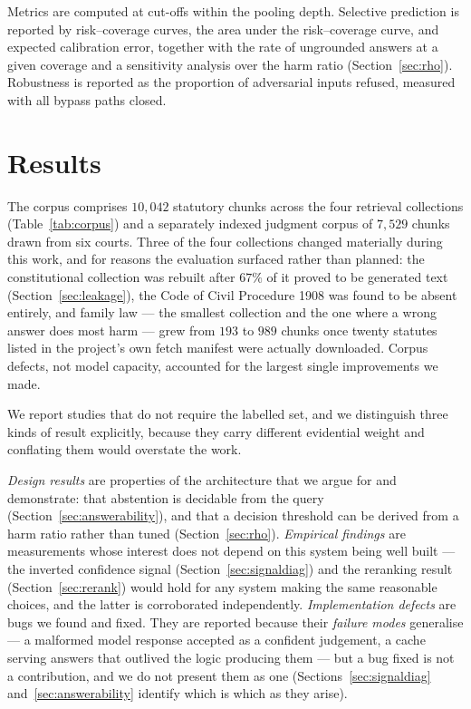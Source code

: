 \documentclass[conference]{IEEEtran}
\begin{document}
Metrics are computed at cut-offs within the pooling depth. Selective prediction is reported by
risk--coverage curves, the area under the risk--coverage curve, and
expected calibration error, together with the rate of ungrounded answers at a
given coverage and a sensitivity analysis over the harm ratio
(Section~\ref{sec:rho}). Robustness is reported as the proportion of adversarial inputs
refused, measured with all bypass paths closed.

\section{Results}
\label{sec:results}
The corpus comprises $10{,}042$ statutory chunks across the four retrieval
collections (Table~\ref{tab:corpus}) and a separately indexed judgment corpus of
$7{,}529$ chunks drawn from six courts. Three of the four collections changed
materially during this work, and for reasons the evaluation surfaced rather than
planned: the constitutional collection was rebuilt after $67\%$ of it proved to
be generated text (Section~\ref{sec:leakage}), the Code of Civil Procedure 1908
was found to be absent entirely, and family law --- the smallest collection and
the one where a wrong answer does most harm --- grew from $193$ to $989$ chunks
once twenty statutes listed in the project's own fetch manifest were actually
downloaded. Corpus defects, not model capacity, accounted for the largest
single improvements we made.

We report studies that do not require the labelled set, and we distinguish three
kinds of result explicitly, because they carry different evidential weight and
conflating them would overstate the work.

\emph{Design results} are properties of the architecture that we argue for and
demonstrate: that abstention is decidable from the query
(Section~\ref{sec:answerability}), and that a decision threshold can be derived
from a harm ratio rather than tuned (Section~\ref{sec:rho}).
\emph{Empirical findings} are measurements whose interest does not depend on
this system being well built --- the inverted confidence signal
(Section~\ref{sec:signaldiag}) and the reranking result
(Section~\ref{sec:rerank}) would hold for any system making the same reasonable
choices, and the latter is corroborated independently.
\emph{Implementation defects} are bugs we found and fixed. They are reported
because their \emph{failure modes} generalise --- a malformed model response
accepted as a confident judgement, a cache serving answers that outlived the
logic producing them --- but a bug fixed is not a contribution, and we do not
present them as one (Sections~\ref{sec:signaldiag} and~\ref{sec:answerability}
identify which is which as they arise).
\end{document}
